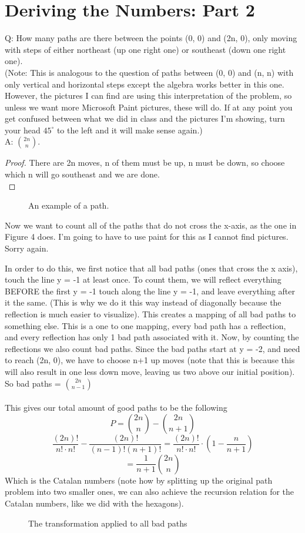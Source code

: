\section{Deriving the Numbers: Part 2}
Q: How many paths are there between the points (0, 0) and (2n, 0), only moving with steps of either northeast (up one right one) or southeast (down one right one).\\ (Note: This is analogous to the question of paths between (0, 0) and (n, n) with only vertical and horizontal steps except the algebra works better in this one. However, the pictures I can find are using this interpretation of the problem, so unless we want more Microsoft Paint pictures, these will do. If at any point you get confused between what we did in class and the pictures I'm showing, turn your head $45^\circ$ to the left and it will make sense again.)\\
A: $\binom{2n} n$. 
\begin{proof}
    There are 2n moves, n of them must be up, n must be down, so choose which n will go southeast and we are done.\\
\end{proof}

\begin{figure}[h]
    \caption{An example of a path.}
     \label{fig:hex3}
\end{figure}

Now we want to count all of the paths that do not cross the x-axis, as the one in Figure 4 does. I'm going to have to use paint for this as I cannot find pictures. Sorry again. 

In order to do this, we first notice that all bad paths (ones that cross the x axis), touch the line y = -1 at least once. To count them, we will reflect everything BEFORE the first y = -1 touch along the line y = -1, and leave everything after it the same. (This is why we do it this way instead of diagonally because the reflection is much easier to visualize). This creates a mapping of all bad paths to something else. This is a one to one mapping, every bad path has a reflection, and every reflection has only 1 bad path associated with it. Now, by counting the reflections we also count bad paths. Since the bad paths start at y = -2, and need to reach (2n, 0), we have to choose n+1 up moves (note that this is because this will also result in one less down move, leaving us two above our initial position). \\So bad paths = $\binom{2n}{n-1}$
\\
\\
This gives our total amount of good paths to be the following $$P = \binom{2n}{n} - \binom{2n}{n+1}$$ $$\frac{(2n)!}{n!\cdot n!}-\frac{(2n)!}{(n-1)!(n+1)!} = \frac{(2n)!}{n!\cdot n!} \cdot(1-\frac{n}{n+1})$$
$$= \frac{1}{n+1}\binom{2n} n$$
Which is the Catalan numbers (note how by splitting up the original path problem into two smaller ones, we can also achieve the recursion relation for the Catalan numbers, like we did with the hexagons).

\begin{figure}[h]
    \caption{The transformation applied to all bad paths}
     \label{fig:hex4}
\end{figure}
% 

